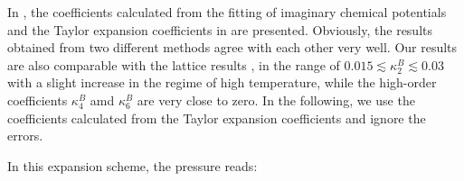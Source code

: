 \documentclass[%
reprint,
superscriptaddress,
preprintnumbers,
amsmath,amssymb,
aps,
prd,
]{revtex4-2}
\def\Fig#1{\Cref{#1}}
\begin{document}
In \Fig{fig:kappa24}, the coefficients calculated from the fitting of imaginary chemical potentials and the Taylor expansion coefficients in  are presented. Obviously, the results obtained from two different methods agree with each other very well. Our results are also comparable with the lattice results \cite{Borsanyi:2021sxv}, in the range of $0.015 \lesssim \kappa^B_2 \lesssim 0.03$ with a slight increase in the regime of high temperature, while the high-order coefficients $\kappa^B_4$ amd $\kappa^B_6$ are very close to zero. In the following, we use the  coefficients calculated from the Taylor expansion coefficients and ignore the errors.

In this expansion scheme, the pressure reads:
\end{document}
